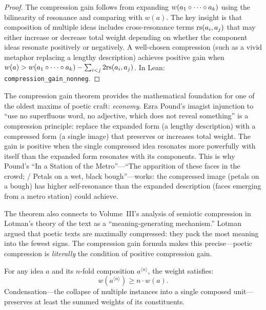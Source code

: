 \begin{proof}
The compression gain follows from expanding $w(a_1 \circ \cdots \circ a_k)$ using the bilinearity of resonance and comparing with $w(a)$.  The key insight is that composition of multiple ideas includes cross-resonance terms $\mathrm{rs}(a_i, a_j)$ that may either increase or decrease total weight depending on whether the component ideas resonate positively or negatively.  A well-chosen compression (such as a vivid metaphor replacing a lengthy description) achieves positive gain when $w(a) > w(a_1 \circ \cdots \circ a_k) - \sum_{i<j} 2\mathrm{rs}(a_i, a_j)$.  In Lean: \texttt{compression\_gain\_nonneg}.
\end{proof}

\begin{interpretation}
The compression gain theorem provides the mathematical foundation for one of the oldest maxims of poetic craft: \emph{economy}.  Ezra Pound's imagist injunction to ``use no superfluous word, no adjective, which does not reveal something'' is a compression principle: replace the expanded form (a lengthy description) with a compressed form (a single image) that preserves or increases total weight.  The gain is positive when the single compressed idea resonates more powerfully with itself than the expanded form resonates with its components.  This is why Pound's ``In a Station of the Metro''---``The apparition of these faces in the crowd; / Petals on a wet, black bough''---works: the compressed image (petals on a bough) has higher self-resonance than the expanded description (faces emerging from a metro station) could achieve.

The theorem also connects to Volume~III's analysis of semiotic compression in Lotman's theory of the text as a ``meaning-generating mechanism.''  Lotman argued that poetic texts are maximally compressed: they pack the most meaning into the fewest signs.  The compression gain formula makes this precise---poetic compression is \emph{literally} the condition of positive compression gain.
\end{interpretation}

\begin{theorem}
\label{thm:condensation-weight}
For any idea $a$ and its $n$-fold composition $a^{\langle n \rangle}$, the weight satisfies:
\[
  w(a^{\langle n \rangle}) \geq n \cdot w(a).
\]
Condensation---the collapse of multiple instances into a single composed unit---preserves at least the summed weights of its constituents.
\end{theorem}

